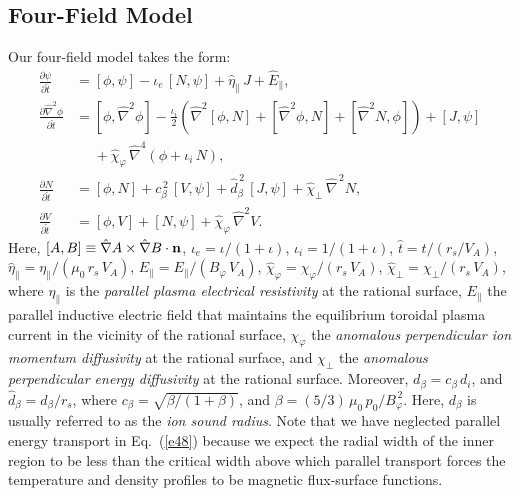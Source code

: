 \documentclass[12pt,prb,aps,notitlepage]{revtex4-1}
\begin{document}
\subsection{Four-Field Model}
Our four-field model takes the form:\cite{book,fw,err2,err3}
\begin{align}
\frac{\partial\psi}{\partial\hat{t}}&= [\phi,\psi] -\iota_e\,[N,\psi]
+\hat{\eta}_\parallel\,J + \hat{E}_\parallel,\label{e16a}\\[0.5ex]
\frac{\partial \hat{\nabla}^2\phi}{\partial \hat{t}}&= [\phi,\hat{\nabla}^2\phi] - \frac{\iota_i}{2}\left(\hat{\nabla}^2[\phi,N] + [\hat{\nabla}^2\phi,N] + [\hat{\nabla}^2 N,\phi]\right) + [J,\psi] \nonumber\\[0.5ex]&\phantom{=}+\hat{\chi}_\varphi  \,\hat{\nabla}^4\!\left(\phi + \iota_i\,N\right), \\[0.5ex]
\frac{\partial N}{\partial \hat{t}}&= [\phi,N] +c_\beta^{\,2}\,[V,\psi] +\hat{d}_\beta^{\,2}\,[J,\psi]
+ \hat{\chi}_\perp\,\hat{\nabla}^{\,2}N,\label{e48}\\[0.5ex]
\frac{\partial V}{\partial\hat{t}}&= [\phi,V] +[N,\psi] + \hat{\chi}_\varphi\,\hat{\nabla}^2 V.\label{e21}
\end{align}
Here, $[A,B]\equiv \hat{\nabla} A\times \hat{\nabla} B\cdot {\bf n}$, $\iota_e=\iota/(1+\iota)$, $\iota_i=1/(1+\iota)$, $\hat{t} = t/(r_s/V_A)$, $\hat{\eta}_{\parallel} = \eta_{\parallel}/(\mu_0\,r_s\,V_A)$, $\hat{E}_\parallel = E_\parallel/(B_\varphi\,V_A)$, 
$\hat{\chi}_\varphi= \chi_\varphi/(r_s\,V_A)$, $\hat{\chi}_\perp=\chi_\perp/(r_s\,V_A)$, where $\eta_{\parallel}$ is the {\em parallel  plasma electrical
resistivity}\/ at the rational surface, $E_\parallel$ the parallel inductive electric field that maintains the equilibrium toroidal
plasma current in the vicinity of the rational surface,  $\chi_\varphi$  the {\em anomalous perpendicular ion momentum
diffusivity}\/ at the rational surface, and $\chi_\perp$ the {\em anomalous perpendicular energy diffusivity}\/ at the rational surface.
Moreover, $d_\beta=c_\beta\,d_i$, and $\hat{d}_\beta=d_\beta/r_s$, where $c_\beta = \sqrt{\beta/(1+\beta)}$, and
$\beta=(5/3)\,\mu_0\,p_0/B_\varphi^{\,2}$. Here, $d_\beta$ is usually referred to as the {\em ion sound radius}. 
Note that we have neglected parallel energy transport in Eq.~(\ref{e48}) because we expect the radial width of the inner region to be less than the critical width above which parallel transport forces the temperature and density profiles to be magnetic flux-surface functions.\cite{hel}
\end{document}
